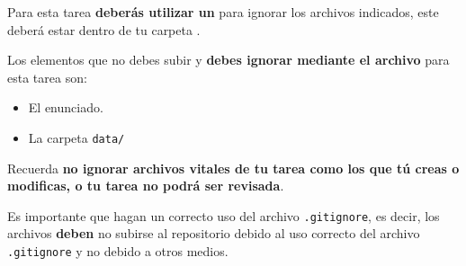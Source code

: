 \label{sec:gitignore}

Para esta tarea \textbf{deberás utilizar un } para ignorar los archivos indicados, este deberá estar dentro de tu carpeta \texttt{\folder}.


Los elementos que no debes subir y \textbf{debes ignorar mediante el archivo } para esta tarea son:
\begin{itemize}
    \item El enunciado.
    \item La carpeta \texttt{data/}
\end{itemize}

Recuerda \textbf{no ignorar archivos vitales de tu tarea como los que tú creas o modificas, o tu tarea no podrá ser revisada}.

Es importante que hagan un correcto uso del archivo \texttt{.gitignore}, es decir, los archivos \textbf{deben} no subirse al repositorio debido al uso correcto del archivo \texttt{.gitignore} y no debido a otros medios.

